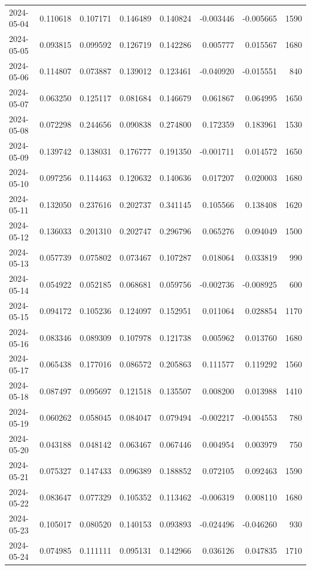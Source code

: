 \begin{tabular}{lrrrrrrr}
2024-05-04 & 0.110618 & 0.107171 & 0.146489 & 0.140824 & -0.003446 & -0.005665 & 1590 \\
2024-05-05 & 0.093815 & 0.099592 & 0.126719 & 0.142286 & 0.005777 & 0.015567 & 1680 \\
2024-05-06 & 0.114807 & 0.073887 & 0.139012 & 0.123461 & -0.040920 & -0.015551 & 840 \\
2024-05-07 & 0.063250 & 0.125117 & 0.081684 & 0.146679 & 0.061867 & 0.064995 & 1650 \\
2024-05-08 & 0.072298 & 0.244656 & 0.090838 & 0.274800 & 0.172359 & 0.183961 & 1530 \\
2024-05-09 & 0.139742 & 0.138031 & 0.176777 & 0.191350 & -0.001711 & 0.014572 & 1650 \\
2024-05-10 & 0.097256 & 0.114463 & 0.120632 & 0.140636 & 0.017207 & 0.020003 & 1680 \\
2024-05-11 & 0.132050 & 0.237616 & 0.202737 & 0.341145 & 0.105566 & 0.138408 & 1620 \\
2024-05-12 & 0.136033 & 0.201310 & 0.202747 & 0.296796 & 0.065276 & 0.094049 & 1500 \\
2024-05-13 & 0.057739 & 0.075802 & 0.073467 & 0.107287 & 0.018064 & 0.033819 & 990 \\
2024-05-14 & 0.054922 & 0.052185 & 0.068681 & 0.059756 & -0.002736 & -0.008925 & 600 \\
2024-05-15 & 0.094172 & 0.105236 & 0.124097 & 0.152951 & 0.011064 & 0.028854 & 1170 \\
2024-05-16 & 0.083346 & 0.089309 & 0.107978 & 0.121738 & 0.005962 & 0.013760 & 1680 \\
2024-05-17 & 0.065438 & 0.177016 & 0.086572 & 0.205863 & 0.111577 & 0.119292 & 1560 \\
2024-05-18 & 0.087497 & 0.095697 & 0.121518 & 0.135507 & 0.008200 & 0.013988 & 1410 \\
2024-05-19 & 0.060262 & 0.058045 & 0.084047 & 0.079494 & -0.002217 & -0.004553 & 780 \\
2024-05-20 & 0.043188 & 0.048142 & 0.063467 & 0.067446 & 0.004954 & 0.003979 & 750 \\
2024-05-21 & 0.075327 & 0.147433 & 0.096389 & 0.188852 & 0.072105 & 0.092463 & 1590 \\
2024-05-22 & 0.083647 & 0.077329 & 0.105352 & 0.113462 & -0.006319 & 0.008110 & 1680 \\
2024-05-23 & 0.105017 & 0.080520 & 0.140153 & 0.093893 & -0.024496 & -0.046260 & 930 \\
2024-05-24 & 0.074985 & 0.111111 & 0.095131 & 0.142966 & 0.036126 & 0.047835 & 1710 \\

\end{tabular}
